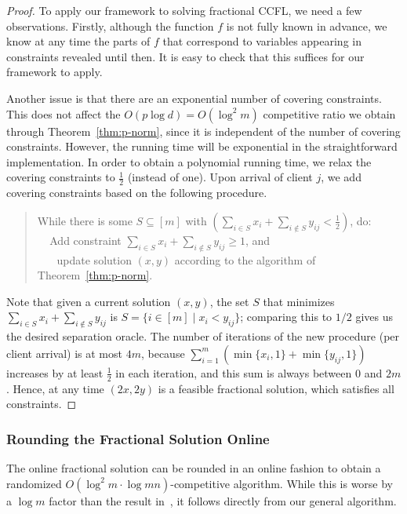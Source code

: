 \documentclass[letterpaper,11pt]{article}
\begin{document}
\begin{proof}
  To apply our framework to solving fractional CCFL, we need a few
  observations. Firstly, although the function $f$ is not fully known in
  advance, we know at any time the parts of $f$ that correspond to
  variables appearing in constraints revealed until then. It is easy to
  check that this suffices for our framework to apply.

  Another issue is that there are an exponential number of covering
  constraints. This does not affect the $O(p\log d) = O(\log^2 m)$
  competitive ratio we obtain through Theorem~\ref{thm:p-norm}, since it
  is independent of the number of covering constraints. However, the
  running time will be exponential in the straightforward
  implementation. In order to obtain a polynomial running time, we relax
  the covering constraints to $\frac12$ (instead of one). Upon arrival
  of client $j$, we add covering constraints based on the following
  procedure.
  \begin{quote}
    While there is some $S\subseteq [m]$ with $\left(\sum_{i\in S} x_i +
      \sum_{i\notin S}y_{ij} < \frac12\right)$, do: \\
    $~~~~~$Add constraint $\sum_{i\in S} x_i + \sum_{i\notin S}y_{ij}
    \ge
    1$, and \\
    $~~~~~~~~$update solution $(x,y)$ according to the algorithm of
    Theorem~\ref{thm:p-norm}.
  \end{quote}
  Note that given a current solution $(x,y)$, the set $S$ that minimizes
  $\sum_{i\in S} x_i + \sum_{i\notin S}y_{ij}$ is $S=\{i\in[m] \mid x_i
  < y_{ij}\}$; comparing this to $1/2$ gives us the desired separation
  oracle. The number of iterations of the new procedure (per client
  arrival) is at most $4m$, because $\sum_{i=1}^m
  \left(\min\{x_i,1\}+\min\{y_{ij},1\} \right)$ increases by at least
  $\frac12$ in each iteration, and this sum is always between $0$ and
  $2m$. Hence, at any time $(2 x, 2y)$ is a feasible fractional
  solution, which satisfies all constraints.
\end{proof}

\subsubsection{Rounding the Fractional Solution Online}
\label{sec:ccfl-round}

The online fractional solution can be rounded in an online fashion to
obtain a randomized $O(\log^2 m\cdot \log mn)$-competitive
algorithm. While this is worse by a $\log m$ factor than the result
in~\cite{ABFP13}, it follows directly from our general algorithm.
\end{document}

